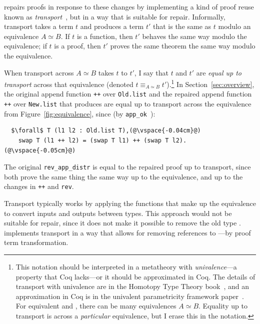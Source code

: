 \toolnamec repairs proofs in response to these changes by implementing a kind of proof reuse known as \textit{transport}~\cite{univalent2013homotopy},
but in a way that is suitable for repair.
Informally, transport takes a term $t$ and produces a term $t'$ that is the same as $t$ modulo an equivalence $A \simeq B$.
If $t$ is a function, then $t'$ behaves the same way modulo the equivalence;
if $t$ is a proof, then $t'$ proves the same theorem the same way modulo the equivalence.

When transport across $A \simeq B$ takes $t$ to $t'$,
I say that $t$ and $t'$ are \textit{equal up to transport}
across that equivalence (denoted $t \equiv_{A \simeq B} t'$).\footnote{This notation should be interpreted in a metatheory with \textit{univalence}---a property that Coq lacks---or it should be approximated in Coq.
The details of transport with univalence are in the Homotopy Type Theory book~\cite{univalent2013homotopy}, and an approximation in Coq is in the univalent parametricity framework paper~\cite{tabareau2017equivalences}. For equivalent \Aa and \B, there can be many equivalences $A \simeq B$.
Equality up to transport is across a \textit{particular} equivalence, but I erase this in the 
notation.}
In Section~\ref{sec:overview}, the original append function \lstinline{++} over \lstinline{Old.list}
and the repaired append function \lstinline{++} over \lstinline{New.list} that \toolnamec produces are
equal up to transport across the equivalence from Figure~\ref{fig:equivalence}, since (by \lstinline{app_ok}~\href{https://github.com/uwplse/pumpkin-pi/blob/v2.0.0/plugin/coq/Swap.v}{}):

\begin{lstlisting}
  $\forall$ T (l1 l2 : Old.list T),(@\vspace{-0.04cm}@)
    swap T (l1 ++ l2) = (swap T l1) ++ (swap T l2).(@\vspace{-0.05cm}@)
\end{lstlisting}
The original \lstinline{rev_app_distr} is equal to the repaired proof up to transport,
since both prove the same thing the same way up to the equivalence, and up to the changes in \lstinline{++}
and \lstinline{rev}.

Transport typically works by applying the functions that make up the equivalence to convert
inputs and outputs between types.
This approach would not be suitable for repair, since it does not make it possible to remove the old type \Aa.
\toolnamec implements transport in a way that allows for removing references to \Aa---by proof term transformation.

